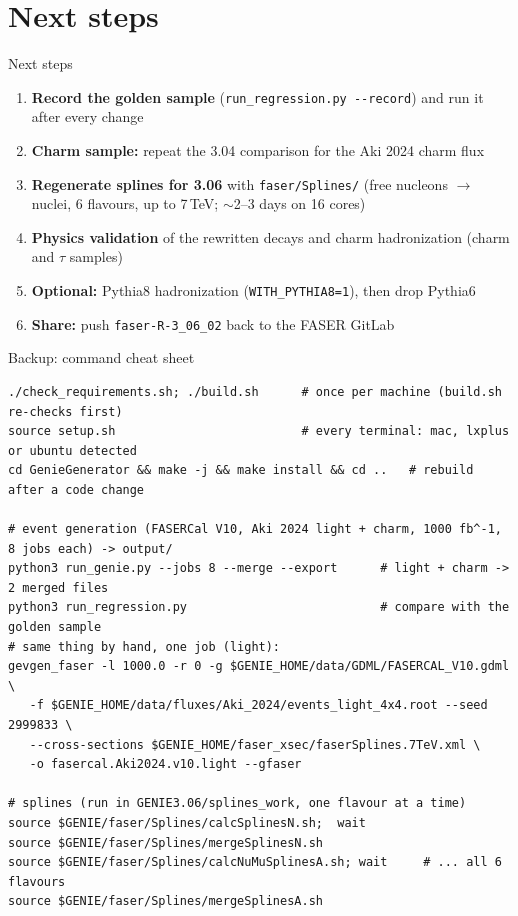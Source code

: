 \documentclass[10pt,aspectratio=169]{beamer}
\newcommand{\code}[1]{\texttt{\small #1}}
\begin{document}
\section{Next steps}

\begin{frame}{Next steps}
  \begin{enumerate}
    \item \textbf{Record the golden sample} (\code{run\_regression.py -{}-record}) and run it after every change
    \item \textbf{Charm sample:} repeat the 3.04 comparison for the Aki 2024 charm flux
    \item \textbf{Regenerate splines for 3.06} with \code{faser/Splines/}
          (free nucleons $\rightarrow$ nuclei, 6 flavours, up to 7\,TeV; $\sim$2--3 days on 16 cores)
    \item \textbf{Physics validation} of the rewritten decays and charm hadronization
          (charm and $\tau$ samples)
    \item \textbf{Optional:} Pythia8 hadronization (\code{WITH\_PYTHIA8=1}), then drop Pythia6
    \item \textbf{Share:} push \code{faser-R-3\_06\_02} back to the FASER GitLab
  \end{enumerate}
\end{frame}

\appendix
\begin{frame}[fragile]{Backup: command cheat sheet}
\begin{lstlisting}
./check_requirements.sh; ./build.sh      # once per machine (build.sh re-checks first)
source setup.sh                          # every terminal: mac, lxplus or ubuntu detected
cd GenieGenerator && make -j && make install && cd ..   # rebuild after a code change

# event generation (FASERCal V10, Aki 2024 light + charm, 1000 fb^-1, 8 jobs each) -> output/
python3 run_genie.py --jobs 8 --merge --export      # light + charm -> 2 merged files
python3 run_regression.py                           # compare with the golden sample
# same thing by hand, one job (light):
gevgen_faser -l 1000.0 -r 0 -g $GENIE_HOME/data/GDML/FASERCAL_V10.gdml \
   -f $GENIE_HOME/data/fluxes/Aki_2024/events_light_4x4.root --seed 2999833 \
   --cross-sections $GENIE_HOME/faser_xsec/faserSplines.7TeV.xml \
   -o fasercal.Aki2024.v10.light --gfaser

# splines (run in GENIE3.06/splines_work, one flavour at a time)
source $GENIE/faser/Splines/calcSplinesN.sh;  wait
source $GENIE/faser/Splines/mergeSplinesN.sh
source $GENIE/faser/Splines/calcNuMuSplinesA.sh; wait     # ... all 6 flavours
source $GENIE/faser/Splines/mergeSplinesA.sh
\end{lstlisting}
\end{frame}
\end{document}
